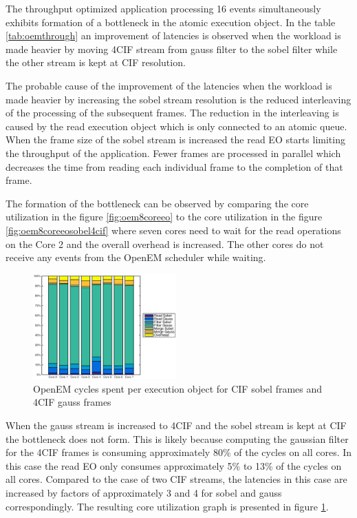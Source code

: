 The throughput optimized application processing 16 events simultaneously exhibits formation of a bottleneck in the atomic execution object. In the table \ref{tab:oemthrough} an improvement of latencies is observed when the workload is made heavier by moving 4CIF stream from gauss filter to the sobel filter while the other stream is kept at CIF resolution.

The probable cause of the improvement of the latencies when the workload is made heavier by increasing the sobel stream resolution is the reduced interleaving of the processing of the subsequent frames. The reduction in the interleaving is caused by the read execution object which is only connected to an atomic queue. When the frame size of the sobel stream is increased the read EO starts limiting the throughput of the application. Fewer frames are processed in parallel which decreases the time from reading each individual frame to the completion of that frame.

The formation of the bottleneck can be observed by comparing the core utilization in the figure \ref{fig:oem8coreeo} to the core utilization in the figure \ref{fig:oem8coreeosobel4cif} where seven cores need to wait for the read operations on the Core 2 and the overall overhead is increased. The other cores do not receive any events from the OpenEM scheduler while waiting.

\begin{figure}[h]
    \begin{center}
        \includegraphics[width=0.49\textwidth]{images/openem_sobelcif_gauss4cif_eo.eps}
        \caption{OpenEM cycles spent per execution object for CIF sobel frames
        and 4CIF gauss frames}
        \label{fig:oem8coreeogauss4cif}
    \end{center}
\end{figure}

When the gauss stream is increased to 4CIF and the sobel stream is kept at CIF the bottleneck does not form. This is likely because computing the gaussian filter for the 4CIF frames is consuming approximately 80\% of the cycles on all cores. In this case the read EO only consumes approximately 5\% to 13\% of the cycles on all cores. Compared to the case of two CIF streams, the latencies in this case are increased by factors of approximately 3 and 4 for sobel and gauss correspondingly. The resulting core utilization graph is presented in figure \ref{fig:oem8coreeogauss4cif}.
\FloatBarrier

